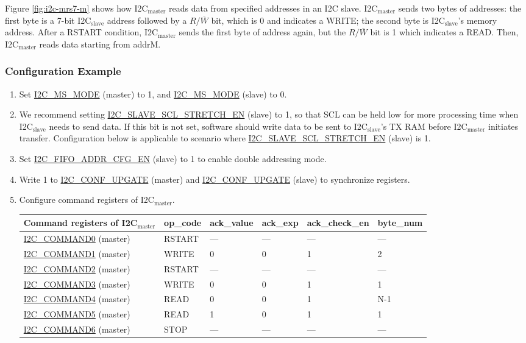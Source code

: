 \documentclass[main\_\_EN.tex]{subfiles}
\begin{document}
Figure \ref{fig:i2c-mrs7-m} shows how I2C$_\text{master}$ reads data from specified addresses in an I2C slave. I2C$_\text{master}$ sends two bytes of addresses: the first byte is a 7-bit I2C$_\text{slave}$ address followed by a $R/\overline W$ bit, which is 0 and indicates a WRITE; the second byte is I2C$_\text{slave}$'s memory address. After a RSTART condition, I2C$_\text{master}$ sends the first byte of address again, but the $R/\overline W$ bit is 1 which indicates a READ. Then, I2C$_\text{master}$ reads data starting from addrM.

\subsubsection{Configuration Example}
\begin{enumerate}
\item Set \hyperref[fielddesc:I2CMSMODE]{I2C\_MS\_MODE} (master) to 1, and \hyperref[fielddesc:I2CMSMODE]{I2C\_MS\_MODE} (slave) to 0.
\item We recommend setting \hyperref[fielddesc:I2CSLAVESCLSTRETCHEN]{I2C\_SLAVE\_SCL\_STRETCH\_EN} (slave) to 1, so that SCL can be held low for more processing time when I2C$_\text{slave}$ needs to send data. If this bit is not set, software should write data to be sent to I2C$_\text{slave}$'s TX RAM before I2C$_\text{master}$ initiates transfer. Configuration below is applicable to scenario where \hyperref[fielddesc:I2CSLAVESCLSTRETCHEN]{I2C\_SLAVE\_SCL\_STRETCH\_EN} (slave) is 1.
\item  Set \hyperref[fielddesc:I2CFIFOADDRCFGEN]{I2C\_FIFO\_ADDR\_CFG\_EN} (slave) to 1 to enable double addressing mode.
\item Write 1 to \hyperref[fielddesc:I2CCONFUPGATE]{I2C\_CONF\_UPGATE} (master) and \hyperref[fielddesc:I2CCONFUPGATE]{I2C\_CONF\_UPGATE} (slave) to synchronize registers.
\item Configure command registers of I2C$_\text{master}$.
\begin{longtable}{ | p{4cm} | p{2cm} | p{2cm} | p{2cm} |p{2cm} | p{2cm} |}
\hline\rowcolor{lightgray}
Command registers of I2C$_\text{master}$& op\_code & ack\_value&ack\_exp&ack\_check\_en&byte\_num  \\ \hline
\hyperref[fielddesc:I2CCOMMAND0]{I2C\_COMMAND0} (master)& RSTART& ---&---&---&---  \\ \hline
\hyperref[fielddesc:I2CCOMMAND1]{I2C\_COMMAND1} (master)& WRITE& 0&0&1&2  \\ \hline
\hyperref[fielddesc:I2CCOMMAND2]{I2C\_COMMAND2} (master)& RSTART& ---&---&---&---  \\ \hline
\hyperref[fielddesc:I2CCOMMAND3]{I2C\_COMMAND3} (master)& WRITE& 0&0&1&1  \\ \hline
\hyperref[fielddesc:I2CCOMMAND4]{I2C\_COMMAND4} (master)& READ& 0&0&1&N-1  \\ \hline
\hyperref[fielddesc:I2CCOMMAND5]{I2C\_COMMAND5} (master)& READ& 1&0&1&1  \\ \hline
\hyperref[fielddesc:I2CCOMMAND6]{I2C\_COMMAND6} (master)& STOP& ---&---&---&---  \\ \hline
\end{longtable}


\end{enumerate}
\end{document}
